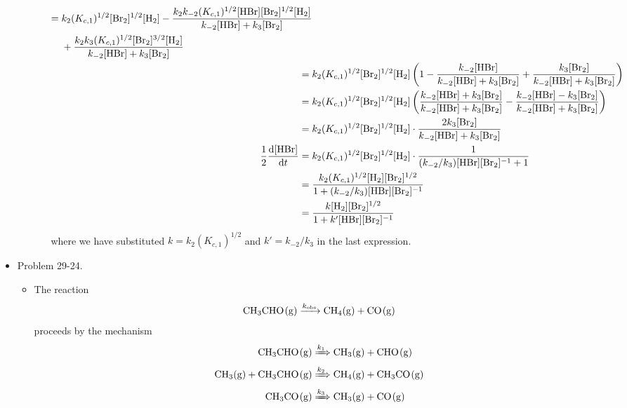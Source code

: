 \documentclass[../notes.tex]{subfiles}
\begin{document}
\begin{itemize}
\begin{itemize}
\begin{itemize}
\begin{align*}
\begin{split}
                    ={}& k_2(K_{c,1})^{1/2}[\ce{Br2}]^{1/2}[\ce{H2}]-\frac{k_2k_{-2}(K_{c,1})^{1/2}[\ce{HBr}][\ce{Br2}]^{1/2}[\ce{H2}]}{k_{-2}[\ce{HBr}]+k_3[\ce{Br2}]}\\
                    &+\frac{k_2k_3(K_{c,1})^{1/2}[\ce{Br2}]^{3/2}[\ce{H2}]}{k_{-2}[\ce{HBr}]+k_3[\ce{Br2}]}
                \end{split}\\
                ={}& k_2(K_{c,1})^{1/2}[\ce{Br2}]^{1/2}[\ce{H2}]\left( 1-\frac{k_{-2}[\ce{HBr}]}{k_{-2}[\ce{HBr}]+k_3[\ce{Br2}]}+\frac{k_3[\ce{Br2}]}{k_{-2}[\ce{HBr}]+k_3[\ce{Br2}]} \right)\\
                ={}& k_2(K_{c,1})^{1/2}[\ce{Br2}]^{1/2}[\ce{H2}]\left( \frac{k_{-2}[\ce{HBr}]+k_3[\ce{Br2}]}{k_{-2}[\ce{HBr}]+k_3[\ce{Br2}]}-\frac{k_{-2}[\ce{HBr}]-k_3[\ce{Br2}]}{k_{-2}[\ce{HBr}]+k_3[\ce{Br2}]} \right)\\
                ={}& k_2(K_{c,1})^{1/2}[\ce{Br2}]^{1/2}[\ce{H2}]\cdot\frac{2k_3[\ce{Br2}]}{k_{-2}[\ce{HBr}]+k_3[\ce{Br2}]}\\
                \frac{1}{2}\dv{[\ce{HBr}]}{t} ={}& k_2(K_{c,1})^{1/2}[\ce{Br2}]^{1/2}[\ce{H2}]\cdot\frac{1}{(k_{-2}/k_3)[\ce{HBr}][\ce{Br2}]^{-1}+1}\\
                ={}& \frac{k_2(K_{c,1})^{1/2}[\ce{H2}][\ce{Br2}]^{1/2}}{1+(k_{-2}/k_3)[\ce{HBr}][\ce{Br2}]^{-1}}\\
                ={}& \frac{k[\ce{H2}][\ce{Br2}]^{1/2}}{1+k'[\ce{HBr}][\ce{Br2}]^{-1}}
            \end{align*}
            where we have substituted $k=k_2(K_{c,1})^{1/2}$ and $k'=k_{-2}/k_3$ in the last expression.
        \end{itemize}
    \end{itemize}
    \item Problem 29-24.
    \begin{itemize}
        \item The reaction
        \begin{equation*}
            \ce{CH3CHO(g) ->[$k_\text{obs}$] CH4(g) + CO(g)}
        \end{equation*}
        proceeds by the mechanism
        \begin{align*}
            \ce{CH3CHO(g)} &\xRightarrow{k_1} \ce{CH3(g) + CHO(g)}\\
            \ce{CH3(g) + CH3CHO(g)} &\xRightarrow{k_2} \ce{CH4(g) + CH3CO(g)}\\
            \ce{CH3CO(g)} &\xRightarrow{k_3} \ce{CH3(g) + CO(g)}\\

\end{align*}
\end{itemize}
\end{itemize}
\end{document}
